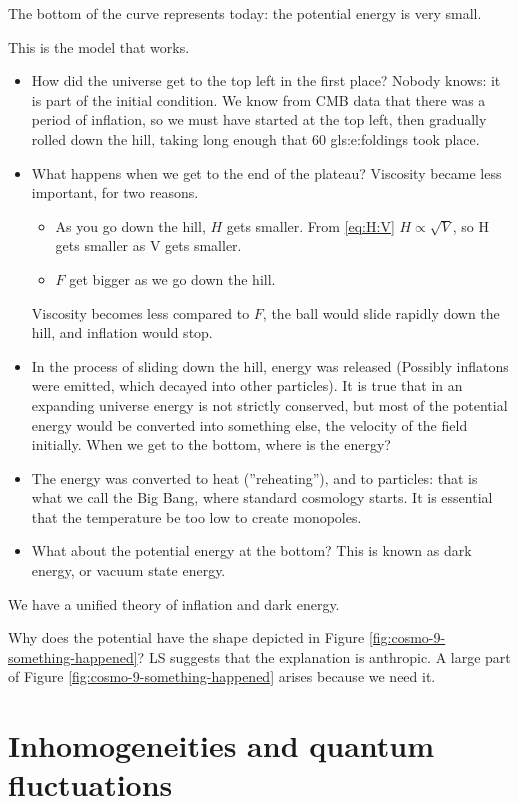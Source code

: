 \documentclass[]{article}
\begin{document}
 The bottom of the curve represents today: the potential energy is very small.
 
 This is the model that works. \begin{itemize}
 	\item How did the universe get to the top left in the first place? Nobody knows: it is part of the initial condition. We know from CMB data that there was a period of inflation, so we must have started at the top left, then gradually rolled down the hill, taking long enough that 60 \glspl{gls:e:folding} took place.
 	\item What happens when we get to the end of the plateau? Viscosity became less important, for two reasons.
 	\begin{itemize}
 		\item As you go down the hill, $H$ gets smaller. From \eqref{eq:H:V} $H\propto \sqrt{V}$, so H gets smaller as V gets smaller.
 		\item $F$ get bigger as we go down the hill.
 	\end{itemize}
 	Viscosity becomes less compared to $F$, the ball would slide rapidly down the hill, and inflation would stop.
 	\item In the process of sliding down the hill, energy was released (Possibly inflatons were emitted, which decayed into other particles). It is true that in an expanding universe energy is not strictly conserved, but most of the potential energy would be converted into something else, the velocity of the field initially. When we get to the bottom, where is the energy?
 	\item The energy was converted to heat (''reheating''), and to particles: that is what we call the Big Bang, where standard cosmology starts. It is essential that the temperature be too low to create monopoles.
 	\item What about the potential energy at the bottom? This is known as dark energy, or vacuum state energy.
 \end{itemize}
 
 We have a unified theory of inflation and dark energy.
 
 Why does the potential have the shape depicted in Figure \ref{fig:cosmo-9-something-happened}? LS suggests that the explanation is anthropic. A large part of Figure \ref{fig:cosmo-9-something-happened} arises because we need it.
 

\section{Inhomogeneities and quantum fluctuations}
\end{document}
